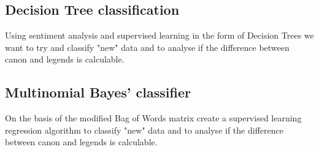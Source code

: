 \subsection{Decision Tree classification}
Using sentiment analysis and supervised learning in the form of Decision Trees we want to try and classify "new" data and to analyse if the difference between canon and legends is calculable.

\subsection{Multinomial Bayes' classifier}
On the basis of the modified Bag of Words matrix create a supervised learning regression algorithm to classify "new" data and to analyse if the difference between canon and legends is calculable.